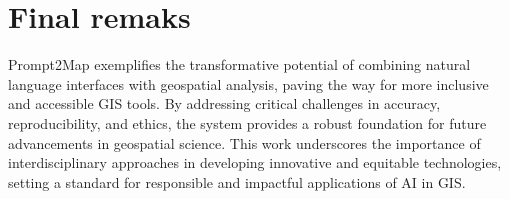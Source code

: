 \section{Final remaks}

Prompt2Map exemplifies the transformative potential of combining natural language interfaces with geospatial analysis, paving the way for more inclusive and accessible GIS tools. By addressing critical challenges in accuracy, reproducibility, and ethics, the system provides a robust foundation for future advancements in geospatial science. This work underscores the importance of interdisciplinary approaches in developing innovative and equitable technologies, setting a standard for responsible and impactful applications of AI in GIS.